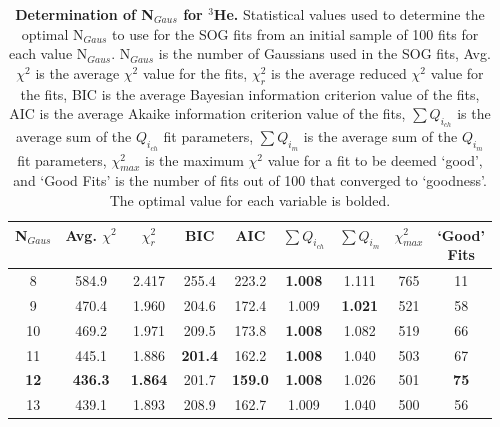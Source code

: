 \vspace{6mm}
\begin{table}[!h]
\centering
\begin{tabular}{|c c c c c c c c c|}
\hline
\textbf{N$_{Gaus}$} & \textbf{Avg. $\chi^2$} & \textbf{$\chi^2_r$} & \textbf{BIC} & \textbf{AIC} & \textbf{$\sum Q_{i_{ch}}$} & \textbf{$\sum Q_{i_{m}}$} & \textbf{$\chi^2_{max}$} & \makecell{\textbf{`Good'}\\ \textbf{Fits}} \\
\hline
8 & 584.9 & 2.417 & 255.4 & 223.2 & \textbf{1.008} & 1.111 & 765 & 11 \\
9 & 470.4 & 1.960 & 204.6 & 172.4 & 1.009 & \textbf{1.021} & 521 & 58 \\
10 & 469.2 & 1.971 & 209.5 & 173.8 & \textbf{1.008} & 1.082 & 519 & 66 \\
11 & 445.1 & 1.886 & \textbf{201.4} & 162.2 & \textbf{1.008} & 1.040 & 503 & 67 \\
\textbf{12} & \textbf{436.3} & \textbf{1.864} & 201.7 & \textbf{159.0} & \textbf{1.008} & 1.026 & 501 & \textbf{75} \\
13 & 439.1 & 1.893 & 208.9 & 162.7 & 1.009 & 1.040 & 500 & 56 \\
\hline
\end{tabular}
\caption[Determination of N$_{Gaus}$ for $^3$He]{{\bf{Determination of N$_{Gaus}$ for $^3$He.}} Statistical values used to determine the optimal N$_{Gaus}$ to use for the SOG fits from an initial sample of 100 fits for each value N$_{Gaus}$. N$_{Gaus}$ is the number of Gaussians used in the SOG fits, Avg. $\chi^2$ is the average $\chi^2$ value for the fits, $\chi^2_r$ is the average reduced $\chi^2$ value for the fits, BIC is the average Bayesian information criterion value of the fits, AIC is the average Akaike information criterion value of the fits, $\sum Q_{i_{ch}}$ is the average sum of the $Q_{i_{ch}}$ fit parameters, $\sum Q_{i_{m}}$ is the average sum of the $Q_{i_{m}}$ fit parameters, $\chi^2_{max}$ is the maximum $\chi^2$ value for a fit to be deemed `good', and `Good Fits' is the number of fits out of 100 that converged to `goodness'. The optimal value for each variable is bolded.}
\label{tab:3he_ngaus}
\end{table}

